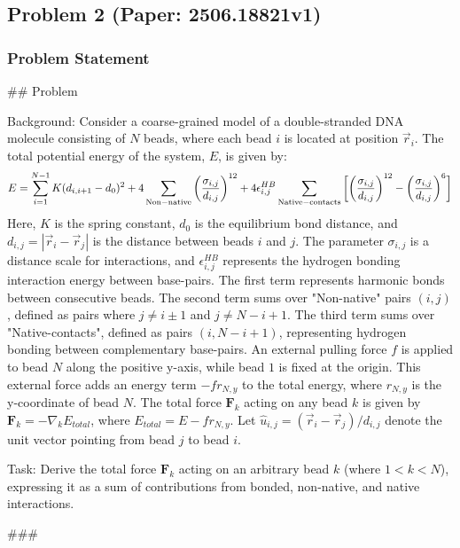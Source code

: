 \documentclass[10pt]{article}
\begin{document}
\newpage
\subsection*{Problem 2 (Paper: 2506.18821v1)}
\subsubsection*{Problem Statement}
## Problem

Background:
Consider a coarse-grained model of a double-stranded DNA molecule consisting of $N$ beads, where each bead $i$ is located at position $\vec{r}_i$. The total potential energy of the system, $E$, is given by:
$$ E = \sum_{i=1}^{N-1}K(d_{i,i+1}-d_0)^2 + 4 \sum_{\rm Non-native}\bigg(\frac{\sigma_{i,j}}{d_{i,j}}\bigg)^{12} +4{\epsilon^{HB}_{i,j}}\sum_{\rm Native-contacts} \bigg[\bigg(\frac{\sigma_{i,j}}{d_{i,j}}\bigg)^{12} -\bigg(\frac{\sigma_{i,j}}{d_{i,j}}\bigg)^6\bigg] $$
Here, $K$ is the spring constant, $d_0$ is the equilibrium bond distance, and $d_{i,j} = |\vec{r}_i - \vec{r}_j|$ is the distance between beads $i$ and $j$. The parameter $\sigma_{i,j}$ is a distance scale for interactions, and $\epsilon^{HB}_{i,j}$ represents the hydrogen bonding interaction energy between base-pairs. The first term represents harmonic bonds between consecutive beads. The second term sums over "Non-native" pairs $(i,j)$, defined as pairs where $j \ne i \pm 1$ and $j \ne N-i+1$. The third term sums over "Native-contacts", defined as pairs $(i, N-i+1)$, representing hydrogen bonding between complementary base-pairs. An external pulling force $f$ is applied to bead $N$ along the positive y-axis, while bead $1$ is fixed at the origin. This external force adds an energy term $-f r_{N,y}$ to the total energy, where $r_{N,y}$ is the y-coordinate of bead $N$. The total force $\mathbf{F}_k$ acting on any bead $k$ is given by $\mathbf{F}_k = -\nabla_k E_{total}$, where $E_{total} = E - f r_{N,y}$. Let $\hat{u}_{i,j} = (\vec{r}_i - \vec{r}_j) / d_{i,j}$ denote the unit vector pointing from bead $j$ to bead $i$.

Task:
Derive the total force $\mathbf{F}_k$ acting on an arbitrary bead $k$ (where $1 < k < N$), expressing it as a sum of contributions from bonded, non-native, and native interactions.

###
\end{document}
